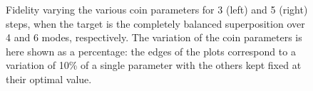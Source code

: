 \begin{figure}[]
    \centering
    \begin{minipage}[b]{0.5\textwidth}
    \end{minipage}%
    \begin{minipage}[b]{0.5\textwidth}
    \end{minipage}
    \caption{
        Fidelity varying the various coin parameters for 3 (left) and 5 (right) steps, when the target is the completely balanced superposition over 4 and 6 modes, respectively.
        The variation of the coin parameters is here shown as a percentage: the edges of the plots correspond to a variation of 10\% of a single parameter with the others kept fixed at their optimal value.
    }
    \label{fig:stabilities_3and5steps_balanced_target}
\end{figure}


